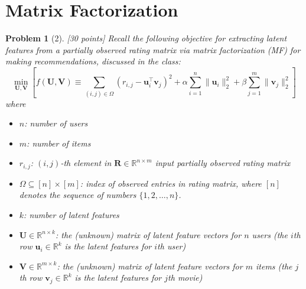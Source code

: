 \documentclass[12pt]{article}
\theoremstyle{quest}
\newtheorem*{problem}{Problem}
\begin{document}
\section*{Matrix Factorization}
\begin{problem}[2] [30 points]
Recall the following objective for extracting latent features from a partially observed rating matrix via matrix factorization (MF) for making recommendations, discussed in the class:
\begin{equation}
\label{eq:matrix_fac}
  \min_{\bm{U},\bm{V}}\left[f(\bm{U},\bm{V}) \equiv \sum_{(i,j)\in\Omega}(r_{i,j}-\bm{u}_i^{\top}\bm{v}_j)^2 + \alpha\sum_{i=1}^{n}\lVert\bm{u}_i\rVert_2^2 + \beta\sum_{j=1}^{m}\lVert\bm{v}_j\rVert_2^2 \right]  
\end{equation}
where
\begin{itemize}
    \item $n$: number of users 
    \item $m$: number of items
    \item $r_{i,j}$: $(i,j)$-th element in $\bm{R} \in \mathbb{R}^{n \times m}$ input partially observed rating matrix
    \item $\Omega \subseteq [n]\times[m]$: index of observed entries in rating matrix, where $[n]$ denotes the sequence of numbers $\{1,2,\dots,n\}$.
    \item $k$: number of latent features
    \item $\bm{U} \in \mathbb{R}^{n \times k}$: the (unknown) matrix of latent feature vectors for $n$ users (the $i$th row $\bm{u}_i \in \mathbb{R}^{k}$ is the latent features for $i$th user)
    \item $\bm{V} \in \mathbb{R}^{m \times k}$: the (unknown) matrix of latent feature vectors for $m$ items (the $j$th row $\bm{v}_j \in \mathbb{R}^{k}$ is the latent features for $j$th movie)
\end{itemize}


\end{problem}
\end{document}
